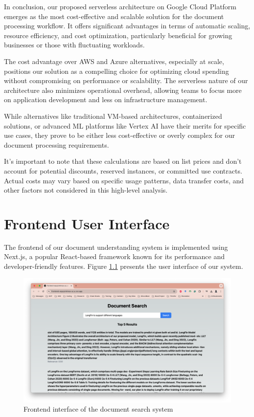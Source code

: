 \documentclass[a4paper, 12pt]{report}
\begin{document}
In conclusion, our proposed serverless architecture on Google Cloud Platform emerges as the most cost-effective and scalable solution for the document processing workflow. It offers significant advantages in terms of automatic scaling, resource efficiency, and cost optimization, particularly beneficial for growing businesses or those with fluctuating workloads.

The cost advantage over AWS and Azure alternatives, especially at scale, positions our solution as a compelling choice for optimizing cloud spending without compromising on performance or scalability. The serverless nature of our architecture also minimizes operational overhead, allowing teams to focus more on application development and less on infrastructure management.

While alternatives like traditional VM-based architectures, containerized solutions, or advanced ML platforms like Vertex AI have their merits for specific use cases, they prove to be either less cost-effective or overly complex for our document processing requirements.

It's important to note that these calculations are based on list prices and don't account for potential discounts, reserved instances, or committed use contracts. Actual costs may vary based on specific usage patterns, data transfer costs, and other factors not considered in this high-level analysis.

\chapter{Frontend User Interface}

The frontend of our document understanding system is implemented using Next.js, a popular React-based framework known for its performance and developer-friendly features. Figure \ref{fig:frontend-screenshot} presents the user interface of our system.

\begin{figure}[htbp]
    \centering
    \includegraphics[width=\textwidth]{frontend-1.png}
    \caption{Frontend interface of the document search system}
    \label{fig:frontend-screenshot}
\end{figure}
\end{document}
